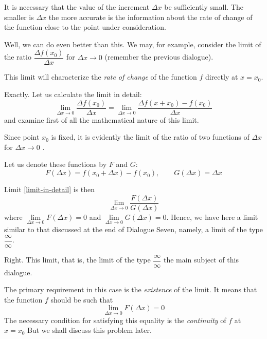 \rdr It is necessary that the value of the increment $\Delta x$  be sufficiently small. The smaller is $\Delta x$ the more accurate is the information about the rate of change of the function close to the point under consideration.

\athr Well, we can do even better than this. We may, for example, consider the limit of the ratio $ \dfrac{\Delta f (x_{0})}{\Delta x} $ for $\Delta x \to 0$	(remember	the	previous dialogue). 

\rdr This limit will characterize the \emph{rate of change} of the function $f$ directly at $x =x_{0}$. 

\athr Exactly. Let us calculate the limit in detail:
\begin{equation}%
\lim\limits_{\Delta x \to 0}  \frac{\Delta f (x_{0})}{\Delta x} = \lim\limits_{\Delta x \to 0}   \frac{\Delta f (x+ x_{0}) - f (x_{0}) }{\Delta x}
\label{limit-in-detail}
\end{equation}
and examine first of all the mathematical nature of this limit.

\rdr Since point $x_{0}$ is fixed, it is evidently the limit of the ratio of two functions of  $\Delta x$  for  $\Delta x \to 0$ .

\athr Let us denote these functions by $F$ and $G$:
\begin{equation*}%
 F(\Delta x) = f( x_{0}+ \Delta x) - f(x_{0}),	\qquad G (\Delta x) = \Delta x
\end{equation*}


\rdr Limit \eqref{limit-in-detail} is then 
\begin{equation*}%
\lim\limits_{\Delta x \to 0} \frac{ F(\Delta x) }{ G(\Delta x) }
\end{equation*}
where $\lim\limits_{\Delta x \to 0}  F(\Delta x)=0$ and $\lim\limits_{\Delta x \to 0}  G(\Delta x)=0$. Hence, we have here a limit similar to that discussed at the end of Dialogue Seven, namely, a limit of the type $\dfrac{\infty}{\infty}$. 

\athr Right. This limit, that is, the limit of the type $\dfrac{\infty}{\infty}$ the main subject of this dialogue.

The primary requirement in this case is the \emph{existence} of the limit. It means that the function $f$ should be such that
\begin{equation*}%
\lim\limits_{\Delta x \to 0}F (\Delta x) = 0
\end{equation*}
The necessary condition for satisfying this equality is the \emph{continuity} of $f$ at $x =x_{0}$ But we shall discuss this problem later.


